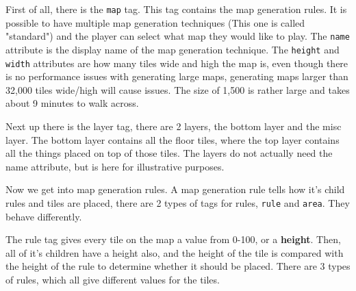 \documentclass{book}
\begin{document}
First of all, there is the \texttt{map} tag. This tag contains the map generation rules. It is possible to have multiple map generation techniques (This one is called "standard") and the player can select what map they would like to play. The \texttt{name} attribute is the display name of the map generation technique. The \texttt{height} and \texttt{width} attributes are how many tiles wide and high the map is, even though there is no performance issues with generating large maps, generating maps larger than 32,000 tiles wide/high will cause issues. The size of 1,500 is rather large and takes about 9 minutes to walk across.

Next up there is the layer tag, there are 2 layers, the bottom layer and the misc layer. The bottom layer contains all the floor tiles, where the top layer contains all the things placed on top of those tiles. The layers do not actually need the name attribute, but is here for illustrative purposes.

Now we get into map generation rules. A map generation rule tells how it's child rules and tiles are placed, there are 2 types of tags for rules, \texttt{rule} and \texttt{area}. They behave differently.

The rule tag gives every tile on the map a value from 0-100, or a \textbf{height}. Then, all of it's children have a height also, and the height of the tile is compared with the height of the rule to determine whether it should be placed. There are 3 types of rules, which all give different values for the tiles. 
\end{document}

